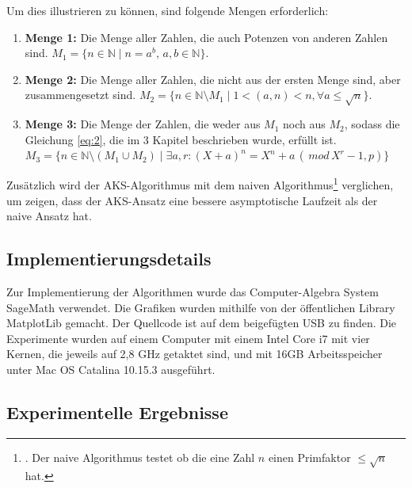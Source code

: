 \documentclass[12pt,oneside]{article}
\theoremstyle{remark}
\theoremstyle{definition}
\begin{document}
Um dies illustrieren zu können, sind folgende Mengen erforderlich:
\begin{enumerate}
    \item \textbf{Menge 1:} Die Menge aller Zahlen, die auch Potenzen von anderen Zahlen sind. $M_1 = \{ n \in \mathbb{N} \mid n = a^b, \, a,b \in \mathbb{N}\}$.\newline
    
    \item \textbf{Menge 2:} Die Menge aller Zahlen, die nicht aus der ersten Menge sind, aber zusammengesetzt sind. $M_2 = \{ n \in \mathbb{N}\setminus	 M_1 \mid 1 < (a,n) < n, \forall a \leq \sqrt{n} \}$.\newline
    
    \item \textbf{Menge 3:} Die Menge der Zahlen, die weder aus $M_1$ noch aus $M_2$, sodass die Gleichung \ref{eq:2}, die im 3 Kapitel beschrieben wurde, erfüllt ist. $M_3 = \{ n \in \mathbb{N} \setminus (M_1 \cup M_2) \mid \exists a,r : (X + a)^n = X^n + a \, (\, mod \, X^r - 1,p) \}$
\end{enumerate}

Zusätzlich wird der AKS-Algorithmus mit dem naiven Algorithmus\footnote{. Der naive Algorithmus testet ob die eine Zahl $n$ einen Primfaktor $\leq  \sqrt{n}$ hat.} verglichen, um zeigen, dass der AKS-Ansatz eine bessere asymptotische Laufzeit als der naive Ansatz hat.

\subsection{Implementierungsdetails}
Zur Implementierung der Algorithmen wurde das Computer-Algebra System SageMath verwendet. Die Grafiken wurden mithilfe von der öffentlichen Library MatplotLib gemacht. Der Quellcode ist auf dem beigefügten USB zu finden. Die Experimente wurden auf einem Computer mit einem Intel Core i7 mit vier Kernen, die jeweils auf 2,8 GHz getaktet sind, und mit 16GB Arbeitsspeicher unter Mac OS Catalina 10.15.3 ausgeführt.

\subsection{Experimentelle Ergebnisse}
\end{document}
